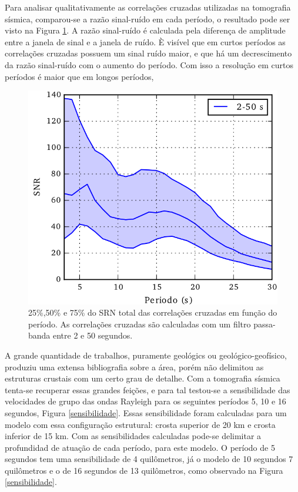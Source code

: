 Para analisar qualitativamente as correlações cruzadas utilizadas na tomografia sísmica, comparou-se a razão sinal-ruído em cada período, o resultado pode ser visto na Figura \ref{SNR}. A razão sinal-ruído é calculada pela diferença de amplitude entre a janela de sinal e a janela de ruído. È visível que em curtos períodos as correlações cruzadas possuem um sinal ruído maior, e que há um decrescimento da razão sinal-ruído com o aumento do período. Com isso a resolução em curtos períodos é maior que em longos períodos,

\begin{figure}[!ht]
\centering
\includegraphics[scale=1]{Figs/SNR.png}
\caption{25\%,50\% e 75\% do  SRN total das correlações cruzadas em função do período. As correlações cruzadas são calculadas com um filtro passa-banda entre 2 e 50 segundos.}
\label{SNR}
\end{figure}

A grande quantidade de trabalhos, puramente geológics ou geológico-geofísico, produziu uma extensa bibliografia sobre a área, porém não delimitou as estruturas crustais com um certo grau de detalhe. Com a tomografia sísmica tenta-se recuperar essas grandes feições, e para tal testou-se a sensibilidade das velocidades  de grupo das ondas Rayleigh para os seguintes períodos 5, 10 e 16 segundos, Figura \ref{sensibilidade}. Essas sensibilidade foram calculadas para um modelo com essa configuração estrutural: crosta superior de 20 km e crosta inferior de 15 km. Com as sensibilidades calculadas pode-se delimitar a profundidad de atuação de cada período, para este modelo. O período de 5 segundos tem uma sensibilidade de 4 quilômetros, já o modelo de 10 segundos 7 quilômetros e o de 16 segundos de 13 quilômetros, como observado na Figura \ref{sensibilidade}.

